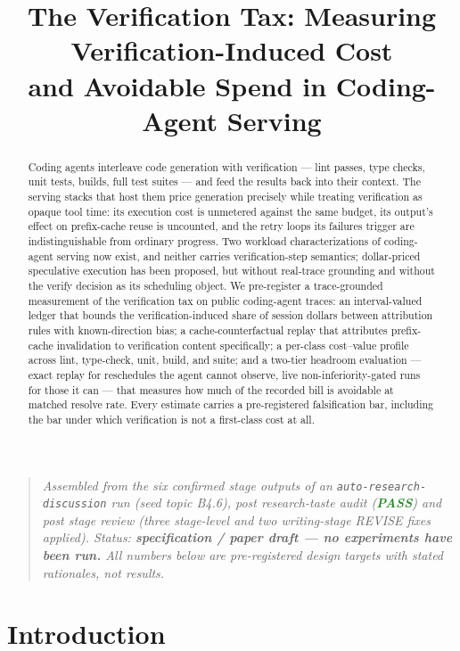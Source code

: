 \documentclass[11pt]{article}
\title{\textbf{The Verification Tax: Measuring Verification-Induced Cost\\ and Avoidable Spend in Coding-Agent Serving}}
\author{}
\date{}
\begin{document}
\maketitle
\vspace{-2em}

\begin{quote}
\small\textit{Assembled from the six confirmed stage outputs of an \texttt{auto-research-discussion} run (seed topic B4.6), post research-taste audit (\textcolor{ForestGreen}{\textbf{PASS}}) and post stage review (three stage-level and two writing-stage REVISE fixes applied). Status: \textbf{specification / paper draft --- no experiments have been run.} All numbers below are pre-registered design targets with stated rationales, not results.}
\end{quote}

\begin{abstract}
Coding agents interleave code generation with verification --- lint passes, type checks, unit tests, builds, full test suites --- and feed the results back into their context. The serving stacks that host them price generation precisely while treating verification as opaque tool time: its execution cost is unmetered against the same budget, its output's effect on prefix-cache reuse is uncounted, and the retry loops its failures trigger are indistinguishable from ordinary progress. Two workload characterizations of coding-agent serving now exist, and neither carries verification-step semantics; dollar-priced speculative execution has been proposed, but without real-trace grounding and without the verify decision as its scheduling object. We pre-register a trace-grounded measurement of the verification tax on public coding-agent traces: an interval-valued ledger that bounds the verification-induced share of session dollars between attribution rules with known-direction bias; a cache-counterfactual replay that attributes prefix-cache invalidation to verification content specifically; a per-class cost--value profile across lint, type-check, unit, build, and suite; and a two-tier headroom evaluation --- exact replay for reschedules the agent cannot observe, live non-inferiority-gated runs for those it can --- that measures how much of the recorded bill is avoidable at matched resolve rate. Every estimate carries a pre-registered falsification bar, including the bar under which verification is not a first-class cost at all.
\end{abstract}

\section{Introduction}
\end{document}
